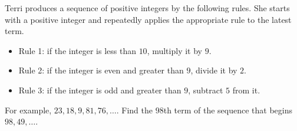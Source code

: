 Terri produces a sequence of positive integers by the following rules. She starts with a positive integer and repeatedly applies the appropriate rule to the latest term.
\begin{itemize}
\item Rule 1: if the integer is less than $10$, multiply it by $9$.
\item Rule 2: if the integer is even and greater than $9$, divide it by $2$.
\item Rule 3: if the integer is odd and greater than $9$, subtract $5$ from it.
\end{itemize}
For example, $23,18,9,81,76,\dots$. Find the $98$th term of the sequence that begins $98,49,\dots$.
